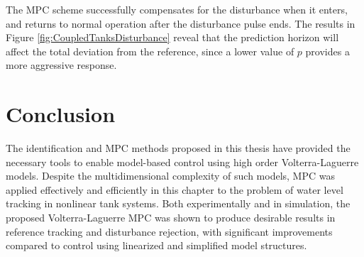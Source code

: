 The MPC scheme successfully compensates for the disturbance when it enters, and returns to normal operation after the disturbance pulse ends. The results in Figure \ref{fig:CoupledTanksDisturbance} reveal that the prediction horizon will affect the total deviation from the reference, since a lower value of $p$ provides a more aggressive response.

\section{Conclusion}

The identification and MPC methods proposed in this thesis have provided the necessary tools to enable model-based control using high order Volterra-Laguerre models. Despite the multidimensional complexity of such models, MPC was applied effectively and efficiently in this chapter to the problem of water level tracking in nonlinear tank systems. Both experimentally and in simulation, the proposed Volterra-Laguerre MPC was shown to produce desirable results in reference tracking and disturbance rejection, with significant improvements compared to control using linearized and simplified model structures. 